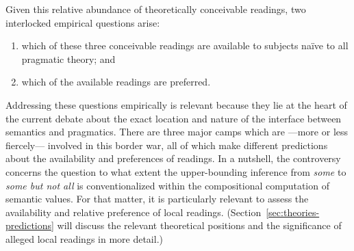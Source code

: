 \documentclass[fleqn,reqno,10pt,draft]{article}
\begin{document}
\noindent Given this relative abundance of theoretically conceivable
readings, two interlocked empirical questions arise:
\begin{enumerate}[Q1:]
\item which of these three
conceivable readings are available to subjects na\"{i}ve to all
pragmatic theory; and
\item which of the available readings are
preferred. 
\end{enumerate}
Addressing these questions empirically is relevant because they lie at
the heart of the current debate about the exact location and nature of
the interface between semantics and pragmatics. There are three major
camps which are ---more or less fiercely--- involved in this border
war, all of which make different predictions about
the availability and preferences of readings. In a nutshell, the
controversy concerns the question to what extent the upper-bounding
inference from \emph{some} to \emph{some but not all} is
conventionalized within the compositional computation of semantic
values. For that matter, it is particularly relevant to assess the
availability and relative preference of local
readings. (Section~\ref{sec:theories-predictions} will discuss the
relevant theoretical positions and the significance of alleged local
readings in more detail.)

\end{document}
